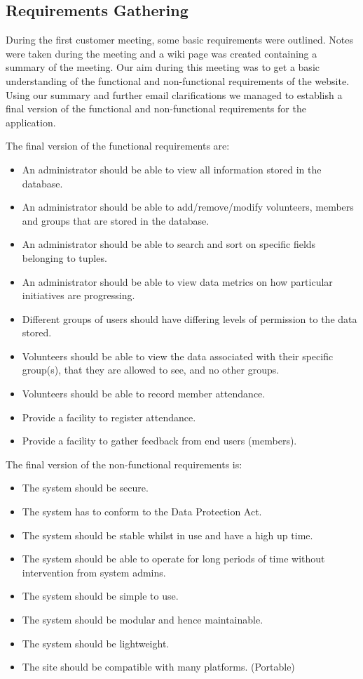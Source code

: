 \documentclass{l3proj}
\begin{document}
\subsection{Requirements Gathering}
\label{requirements}

During the first customer meeting, some basic requirements were outlined. Notes were taken during the meeting and a wiki page was created containing a summary of the meeting. Our aim during this meeting was to get a basic understanding of the functional and non-functional requirements of the website. Using our summary and further email clarifications we managed to establish a final version of the functional and non-functional requirements for the application.

The final version of the functional requirements are:
\begin{itemize}
\item An administrator should be able to view all information stored in the database.
\item An administrator should be able to add/remove/modify volunteers, members and groups that are stored in the database.
\item An administrator should be able to search and sort on specific fields belonging to tuples.
\item An administrator should be able to view data metrics on how particular initiatives are progressing.
\item Different groups of users should have differing levels of permission to the data stored.
\item Volunteers should be able to view the data associated with their specific group(s), that they are allowed to see, and no other groups.
\item Volunteers should be able to record member attendance.
\item Provide a facility to register attendance.
\item Provide a facility to gather feedback from end users (members).
\end{itemize}

The final version of the non-functional requirements is:
\begin{itemize}
\item The system should be secure.
\item The system has to conform to the Data Protection Act.
\item The system should be stable whilst in use and have a high up time.
\item The system should be able to operate for long periods of time without intervention from system admins.
\item The system should be simple to use.
\item The system should be modular and hence maintainable.
\item The system should be lightweight.
\item The site should be compatible with many platforms. (Portable)

\end{itemize}
\end{document}

